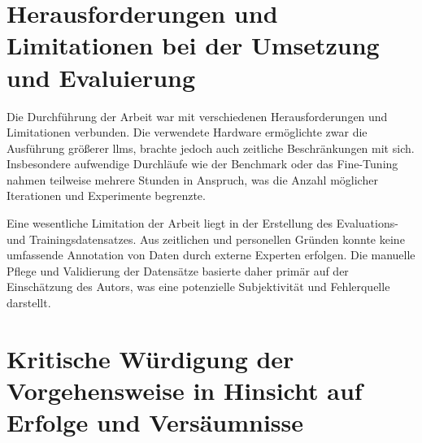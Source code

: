 

\section{Herausforderungen und Limitationen bei der Umsetzung und Evaluierung}

Die Durchführung der Arbeit war mit verschiedenen Herausforderungen und Limitationen verbunden.
Die verwendete Hardware ermöglichte zwar die Ausführung größerer \glspl{llm}, brachte jedoch auch zeitliche Beschränkungen mit sich.
Insbesondere aufwendige Durchläufe wie der Benchmark oder das Fine-Tuning nahmen teilweise mehrere Stunden in Anspruch, was die Anzahl möglicher Iterationen und Experimente begrenzte.

Eine wesentliche Limitation der Arbeit liegt in der Erstellung des Evaluations- und Trainingsdatensatzes.
Aus zeitlichen und personellen Gründen konnte keine umfassende Annotation von Daten durch externe Experten erfolgen.
Die manuelle Pflege und Validierung der Datensätze basierte daher primär auf der Einschätzung des Autors, was eine potenzielle Subjektivität und Fehlerquelle darstellt.


\section{Kritische Würdigung der Vorgehensweise in Hinsicht auf Erfolge und Versäumnisse}


